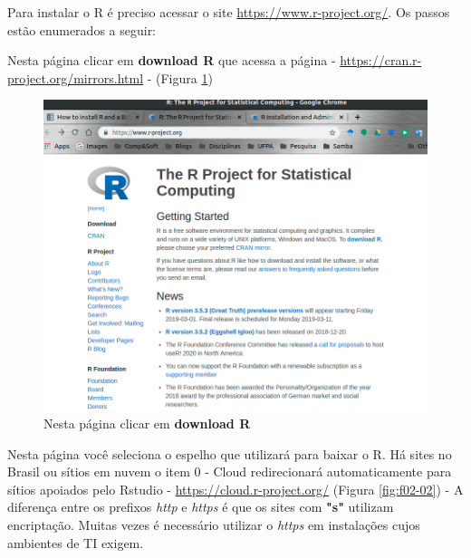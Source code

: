 \documentclass[12pt,a4paper,oneside]{erdc}
\begin{document}
Para instalar o R é preciso acessar o site \url{https://www.r-project.org/}. Os passos estão enumerados a seguir:

Nesta página clicar em \textbf{download R} que acessa a página - \url{https://cran.r-project.org/mirrors.html} - (Figura \ref{fig:f02-01})





\begin{figure}[htpb]
	\centering
	\includegraphics[width=\linewidth]{../figs/BP_Curso_TecComp_00_2019_f02-01}
	\caption{Nesta página clicar em \textbf{download R}}
	\label{fig:f02-01}
\end{figure}

Nesta página você seleciona o espelho que utilizará para baixar o R. Há sites no Brasil ou sítios em nuvem o item 0 - Cloud redirecionará automaticamente para sítios apoiados pelo Rstudio  -  \url{https://cloud.r-project.org/} (Figura \ref{fig:f02-02}) - A diferença entre os prefixos \textit{http} e \textit{https} é que os sites com \textbf{"s"} utilizam encriptação. Muitas vezes é necessário utilizar o \textit{https} em instalações cujos ambientes de TI exigem.
\end{document}
